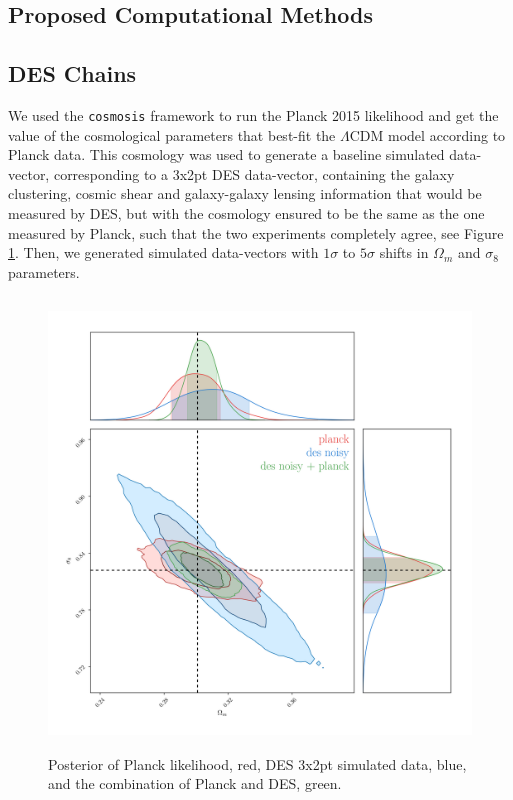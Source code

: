 \documentclass[12pt]{article}
\begin{document}
\begin{small}
\section{Proposed Computational Methods}
\subsection{DES Chains}

We used the {\tt cosmosis} framework to run the Planck 2015 likelihood and get the value of the cosmological parameters that best-fit the $\Lambda$CDM model according to Planck data. This cosmology was used to generate a baseline simulated data-vector, corresponding to a 3x2pt DES data-vector, containing the galaxy clustering, cosmic shear and galaxy-galaxy lensing information that would be measured by DES, but with the cosmology ensured to be the same as the one measured by Planck, such that the two experiments completely agree, see Figure \ref{figure1}. Then, we generated simulated data-vectors with $1\sigma$ to $5\sigma$ shifts in $\Omega_m$ and $\sigma_8$ parameters. 

\begin{figure}[h!]
\begin{center}
\includegraphics[height=12cm]{des+planck_poly2D.png}
\end{center}
 \caption{Posterior of Planck likelihood, red, DES 3x2pt simulated data, blue, and the combination of Planck and DES, green.}
\label{figure1}
\end{figure}


\end{small}
\end{document}
